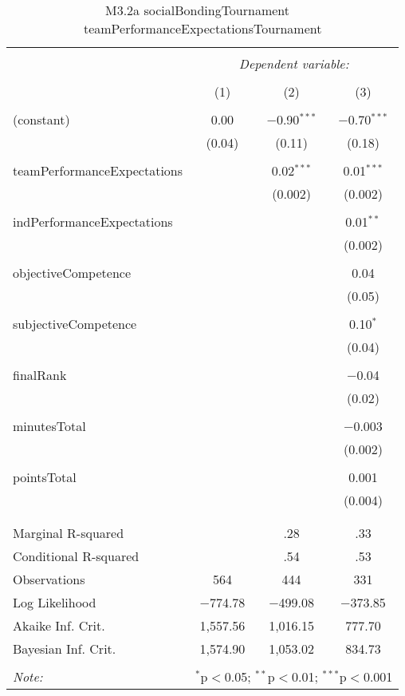 
\begin{table}[!htbp] \centering 
  \caption{M3.2a socialBondingTournament ~ teamPerformanceExpectationsTournament} 
  \label{tab:MLM32ateamPerfBondingTournament} 
\footnotesize 
\begin{tabular}{@{\extracolsep{5pt}}lccc} 
\\[-1.8ex]\hline 
\hline \\[-1.8ex] 
 & \multicolumn{3}{c}{\textit{Dependent variable:}} \\ 
\cline{2-4} 
\\[-1.8ex] & (1) & (2) & (3)\\ 
\hline \\[-1.8ex] 
 (constant) & 0.00 & $-$0.90$^{***}$ & $-$0.70$^{***}$ \\ 
  & (0.04) & (0.11) & (0.18) \\ 
  & & & \\ 
 teamPerformanceExpectations &  & 0.02$^{***}$ & 0.01$^{***}$ \\ 
  &  & (0.002) & (0.002) \\ 
  & & & \\ 
 indPerformanceExpectations &  &  & 0.01$^{**}$ \\ 
  &  &  & (0.002) \\ 
  & & & \\ 
 objectiveCompetence &  &  & 0.04 \\ 
  &  &  & (0.05) \\ 
  & & & \\ 
 subjectiveCompetence &  &  & 0.10$^{*}$ \\ 
  &  &  & (0.04) \\ 
  & & & \\ 
 finalRank &  &  & $-$0.04 \\ 
  &  &  & (0.02) \\ 
  & & & \\ 
 minutesTotal &  &  & $-$0.003 \\ 
  &  &  & (0.002) \\ 
  & & & \\ 
 pointsTotal &  &  & 0.001 \\ 
  &  &  & (0.004) \\ 
  & & & \\ 
\hline \\[-1.8ex] 
Marginal R-squared &  & .28 & .33 \\ 
Conditional R-squared &  & .54 & .53 \\ 
Observations & 564 & 444 & 331 \\ 
Log Likelihood & $-$774.78 & $-$499.08 & $-$373.85 \\ 
Akaike Inf. Crit. & 1,557.56 & 1,016.15 & 777.70 \\ 
Bayesian Inf. Crit. & 1,574.90 & 1,053.02 & 834.73 \\ 
\hline 
\hline \\[-1.8ex] 
\textit{Note:}  & \multicolumn{3}{r}{$^{*}$p$<$0.05; $^{**}$p$<$0.01; $^{***}$p$<$0.001} \\ 
\end{tabular} 
\end{table} 
